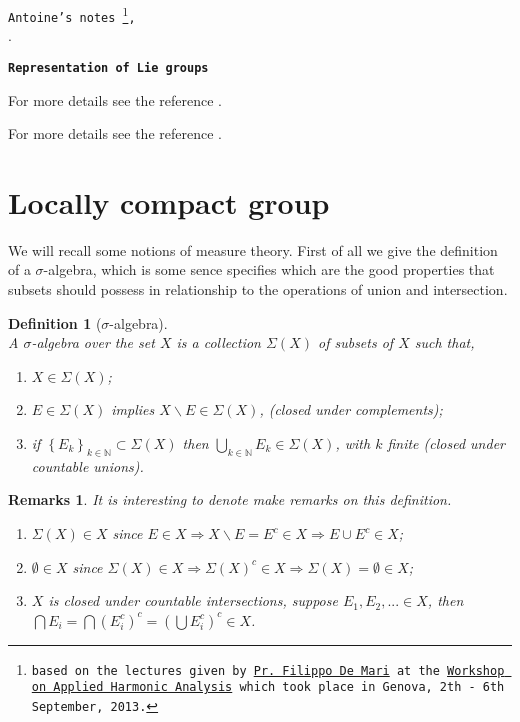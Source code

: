 \documentclass[a4paper,11pt]{article} %
\numberwithin{equation}{section} %
\numberwithin{figure}{section} %
\newtheorem{dfn}{Definition}
\newtheorem{rems}{Remarks}
\begin{document}

\begin{flushright}
\texttt{Antoine's notes 
\footnote{based on the lectures given by \href{http://www.dima.unige.it/~demari/}{Pr. Filippo De Mari} at the \href{http://anarm.dima.unige.it/genova2013/}{Workshop on Applied Harmonic Analysis} which took place in Genova, 2th - 6th September, 2013.},} \\
\texttt{\version}.
\end{flushright}

\bigskip

\begin{LARGE}
\noindent
\texttt{\textbf{Representation of Lie groups}}
\end{LARGE}

\vspace{1cm}

For more details see the reference \cite{Varada1984}.

\tableofcontents

For more details see the reference \cite{Varada1984}.

\section{Locally compact group}

We will recall some notions of measure theory. First of all we give the definition of a $\sigma$-algebra, which is some sence specifies which are the good properties that subsets should possess in relationship to the operations of union and intersection. 

\begin{dfn}[$\sigma$-algebra] \cite[Def. 1.30, p. 16]{Moretti2012} \\
A $\sigma$-algebra over the set $X$ is a collection $\Sigma(X)$ of subsets of $X$ such that,
\begin{enumerate}
\item $X \in \Sigma(X)$; 
\item $E \in \Sigma(X)$ implies $X \backslash E \in \Sigma(X)$, \; (closed under complements);
\item if $\left\{ E_k \right\} _{k \in \mathbb{N}} \subset \Sigma(X)$ then $\underset{k \in \mathbb{N}}{\bigcup} E_k \in \Sigma(X)$, with $k$ finite \; (closed under countable unions).
\end{enumerate}
\end{dfn}

\begin{rems}
 It is interesting to denote make remarks on this definition. 
\begin{enumerate}
\item $\Sigma(X) \in X$ since $E \in X \Rightarrow X \backslash E = E^c \in X \Rightarrow E \cup E^c \in X$;
\item $\emptyset \in X$ since $\Sigma(X) \in X \Rightarrow \Sigma(X)^c \in X \Rightarrow \Sigma(X) = \emptyset \in X$;
\item $X$ is closed under countable intersections, suppose $E_1, E_2, ... \in X$, then $\bigcap E_i = \bigcap (E_i^c)^c = ( \bigcup E_i^c )^c \in X$.
\end{enumerate}
\end{rems}
\end{document}
